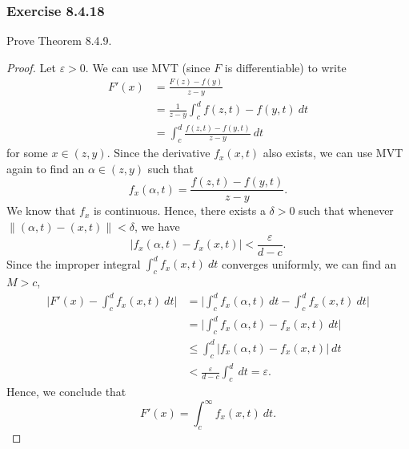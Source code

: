\subsubsection{Exercise 8.4.18} Prove Theorem 8.4.9.
\begin{proof}
Let \( \varepsilon > 0  \). We can use MVT (since \( F  \) is differentiable) to write  
\begin{align*}
    F'(x) &= \frac{ F(z) - f(y)  }{ z - y  }  \\
          &= \frac{ 1 }{ z - y  } \int_{ c }^{ d } f(z,t) - f(y,t) \  dt \\
          &= \int_{ c }^{ d }  \frac{ f(z,t) - f(y,t)  }{ z - y } \ dt
\end{align*}
for some \( x \in (z,y)   \). Since the derivative \( f_{x}(x,t)  \) also exists, we can use MVT again to find an \( \alpha \in (z,y)   \) such that 
\[  f_{x}(\alpha, t) = \frac{ f(z,t) - f(y,t)  }{ z - y  }. \] 
We know that \( f_{x} \) is continuous. Hence, there exists a \(  \delta  > 0 \) such that whenever \( \lVert (\alpha, t) - (x,t)  \rVert < \delta \), we have 
\[  | f_{x}(\alpha, t ) - f_{x}(x, t) | < \frac{ \varepsilon  }{ d - c  }.\]
Since the improper integral \( \int_{ c }^{ d }   f_{x}(x,t) \ dt  \) converges uniformly, we can find an \( M > c  \),
\begin{align*}
    \Big| F'(x) - \int_{ c }^{ d } f_{x}(x,t) \ dt \Big| &= \Big| \int_{ c }^{ d }  f_{x}(\alpha, t) \ dt - \int_{ c }^{ d }  f_{x}(x,t) \ dt \Big|  \\
                                                         &= \Big| \int_{ c }^{ d }  f_{x}(\alpha, t) - f_{x}(x,t) \ dt \Big|  \\
                                                         &\leq \int_{ c }^{ d }  | f_{x}(\alpha, t ) - f_{x}(x,t)  | \ dt \\
                                                         &< \frac{ \varepsilon  }{  d-c   }  \int_{ c }^{ d }  \ dt = \varepsilon.
\end{align*}
Hence, we conclude that 
\[  F'(x) = \int_{ c }^{ \infty } f_{x}(x,t) \  dt. \]
\end{proof}


